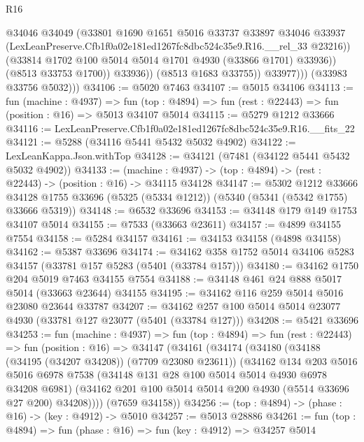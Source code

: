 \begin{lexlean}{R16}
\begin{coremodule}
                        @34046
                        @34049
                        (@33801
                          @1690
                          @1651
                          @5016
                          @33737
                          @33897
                          @34046
                          @33937
                          (LexLeanPreserve.Cfb1f0a02e181ed1267fc8dbc524c35e9.R16.__rel_33 @23216))
                        (@33814 @1702 @100 @5014 @5014 @1701 @4930 (@33866 @1701) @33936))
                      (@8513 @33753 @1700))
                    @33936))
                (@8513 @1683 @33755))
              @33977)))
        (@33983 @33756 @5032)))
@34106 := @5020 @7463
@34107 := @5015 @34106
@34113 := fun (machine : @4937) =>
  fun (top : @4894) => fun (rest : @22443) => fun (position : @16) => @5013 @34107 @5014
@34115 := @5279 @1212 @33666
@34116 := LexLeanPreserve.Cfb1f0a02e181ed1267fc8dbc524c35e9.R16.__fits_22
@34121 := @5288 (@34116 @5441 @5432 @5032 @4902)
@34122 := LexLeanKappa.Json.withTop
@34128 := @34121 (@7481 (@34122 @5441 @5432 @5032 @4902))
@34133 := (machine : @4937) -> (top : @4894) -> (rest : @22443) -> (position : @16) -> @34115 @34128
@34147 := @5302
    @1212
    @33666
    @34128
    @1755
    @33696
    (@5325 (@5334 @1212))
    (@5340 (@5341 (@5342 @1755) @33666 @5319))
@34148 := @6532 @33696
@34153 := @34148 @179 @149 @1753 @34107 @5014
@34155 := @7533 (@33663 @23611)
@34157 := @4899 @34155 @7554
@34158 := @5284 @34157
@34161 := @34153 @34158 (@4898 @34158)
@34162 := @5387 @33696
@34174 := @34162 @358 @1752 @5014 @34106 @5283 @34157 (@33781 @157 @5283 (@5401 (@33784 @157)))
@34180 := @34162 @1750 @204 @5019 @7463 @34155 @7554
@34188 := @34148 @461 @24 @888 @5017 @5014 (@33663 @23644) @34155
@34195 := @34162 @116 @259 @5014 @5016 @23080 @23644 @33787
@34207 := @34162 @257 @100 @5014 @5014 @23077 @4930 (@33781 @127 @23077 (@5401 (@33784 @127)))
@34208 := @5421 @33696
@34253 := fun (machine : @4937) =>
  fun (top : @4894) =>
  fun (rest : @22443) =>
  fun (position : @16) =>
  @34147
    (@34161
      (@34174
        (@34180
          (@34188 (@34195 (@34207 @34208)) (@7709 @23080 @23611))
          (@34162
            @134
            @203
            @5016
            @5016
            @6978
            @7538
            (@34148 @131 @28 @100 @5014 @5014 @4930 @6978 @34208 @6981)
            (@34162 @201 @100 @5014 @5014 @200 @4930 (@5514 @33696 @27 @200) @34208))))
      (@7659 @34158))
@34256 := (top : @4894) -> (phase : @16) -> (key : @4912) -> @5010
@34257 := @5013 @28886
@34261 := fun (top : @4894) => fun (phase : @16) => fun (key : @4912) => @34257 @5014

\end{coremodule}
\end{lexlean}
